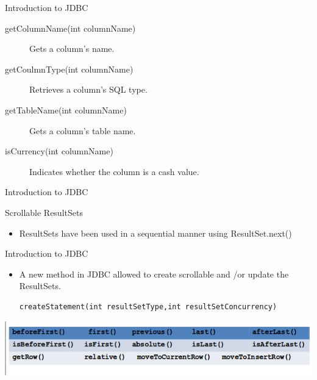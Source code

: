 \documentclass[14pt]{beamer}
\begin{document}
\begin{frame}[fragile]{Introduction to JDBC}
\begin{description}
\item [getColumnName(int columnName)] Gets a column's name.
\item [getCoulmnType(int columnName)] Retrieves a column's SQL type.
\item [getTableName(int columnName)] Gets a column's table name.
\item [isCurrency(int columnName)] Indicates whether the column is a cash value.
\end{description}
\end{frame}


\begin{frame}[fragile]{Introduction to JDBC}
\begin{block}{}
Scrollable ResultSets
\end{block}
\begin{itemize}
\item ResultSets have been used in a sequential manner using ResultSet.next()

\end{itemize}

\end{frame}
\begin{frame}[fragile]{Introduction to JDBC}
\begin{itemize}
\item A new method in JDBC allowed to create scrollable and /or update the ResultSets.
\begin{lstlisting}[numbers=none]
createStatement(int resultSetType,int resultSetConcurrency)
\end{lstlisting}
\end{itemize}
\begin{center}
    \includegraphics[scale=0.5]{JEE-M03-S01-Image12.png}
  \end{center}
\end{frame}
\end{document}
